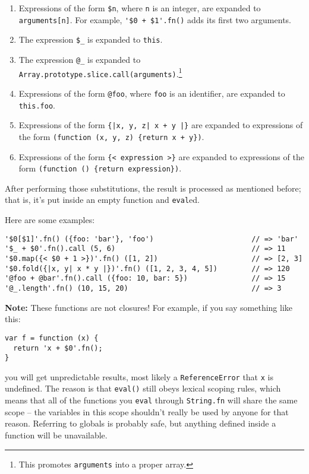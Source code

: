 \documentclass{report}
\begin{document}
\begin{enumerate}
\item Expressions of the form \verb|$n|, where \verb|n| is an integer, are expanded to \verb|arguments[n]|. For example, \verb|'$0 + $1'.fn()| adds its first two arguments.
\item The expression \verb|$_| is expanded to \verb|this|.
\item The expression \verb|@_| is expanded to \verb|Array.prototype.slice.call(arguments)|.\footnote{This promotes {\tt arguments} into a proper array.}
\item Expressions of the form \verb|@foo|, where \verb|foo| is an identifier, are expanded to \verb|this.foo|.
\item Expressions of the form \verb/{|x, y, z| x + y |}/ are expanded to expressions of the form \verb|(function (x, y, z) {return x + y})|.
\item Expressions of the form \verb|{< expression >}| are expanded to expressions of the form \verb|(function () {return expression})|.
\end{enumerate}

      After performing those substitutions, the result is processed as mentioned before; that is, it's put inside an empty function and \verb|eval|ed.

      Here are some examples:

\begin{verbatim}
'$0[$1]'.fn() ({foo: 'bar'}, 'foo')                       // => 'bar'
'$_ + $0'.fn().call (5, 6)                                // => 11
'$0.map({< $0 + 1 >})'.fn() ([1, 2])                      // => [2, 3]
'$0.fold({|x, y| x * y |})'.fn() ([1, 2, 3, 4, 5])        // => 120
'@foo + @bar'.fn().call ({foo: 10, bar: 5})               // => 15
'@_.length'.fn() (10, 15, 20)                             // => 3
\end{verbatim}

      {\bf Note:} These functions are not closures! For example, if you say something like this:

\begin{verbatim}
var f = function (x) {
  return 'x + $0'.fn();
}
\end{verbatim}

      \noindent you will get unpredictable results, most likely a \verb|ReferenceError| that \verb|x| is undefined. The reason is that \verb|eval()| still obeys lexical scoping rules, which
      means that all of the functions you \verb|eval| through \verb|String.fn| will share the same scope -- the variables in this scope shouldn't really be used by anyone for that reason.
      Referring to globals is probably safe, but anything defined inside a function will be unavailable.
\end{document}
